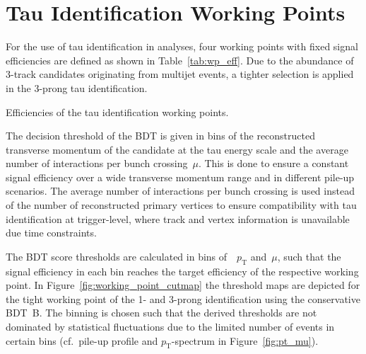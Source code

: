 \section{Tau Identification Working Points}
\label{sec:bdt_working_points}

For the use of tau identification in analyses, four working points with fixed
signal efficiencies are defined as shown in Table~\ref{tab:wp_eff}. Due to the
abundance of 3-track \tauhadvis candidates originating from multijet events, a
tighter selection is applied in the 3-prong tau identification.

\begin{table}[htb]
  \centering
  {\small}
  \caption{Efficiencies of the tau identification working points.}
  \label{tab:wp_eff}
\end{table}

The decision threshold of the BDT is given in bins of the reconstructed
transverse momentum of the \tauhadvis candidate at the tau energy scale and the
average number of interactions per bunch crossing~$\mu$. This is done to ensure
a constant signal efficiency over a wide transverse momentum range and in
different pile-up scenarios. The average number of interactions per bunch
crossing is used instead of the number of reconstructed primary vertices to
ensure compatibility with tau identification at trigger-level, where track and
vertex information is unavailable due time constraints.

The BDT score thresholds are calculated in bins of~\tauhadvis~$p_\text{T}$
and~$\mu$, such that the signal efficiency in each bin reaches the target
efficiency of the respective working point. In
Figure~\ref{fig:working_point_cutmap} the threshold maps are depicted for the
tight working point of the 1- and 3-prong identification using the conservative
\mbox{BDT B}. The binning is chosen such that the derived thresholds are not
dominated by statistical fluctuations due to the limited number of events in
certain bins (cf.\ pile-up profile and \tauhadvis $p_\text{T}$-spectrum in
Figure~\ref{fig:pt_mu}).

